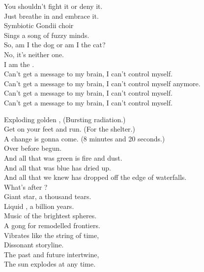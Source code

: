 You shouldn't fight it or deny it. \\
Just breathe in and embrace it. \\
Symbiotic Gondii choir \\
Sings a song of fuzzy minds. \\
So, am I the dog or am I the cat? \\
No, it's neither one. \\
I am the . \\

Can't get a message to my brain, I can't control myself. \\
Can't get a message to my brain, I can't control myself anymore. \\
Can't get a message to my brain, I can't control myself. \\
Can't get a message to my brain, I can't control myself. \\





Exploding golden , (Bursting radiation.) \\
Get on your feet and run. (For the shelter.) \\
A change is gonna come. (8 minutes and 20 seconds.) \\
Over before begun. \\

And all that was green is fire and dust. \\
And all that was blue has dried up. \\
And all that we knew has dropped off the edge of waterfalls. \\
What's after ? \\

Giant star, a thousand tears. \\
Liquid , a billion years. \\
Music of the brightest spheres. \\
A gong for remodelled frontiers. \\

Vibrates like the string of time, \\
Dissonant storyline. \\
The past and future intertwine, \\
The sun explodes at any time. \\

